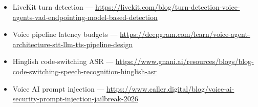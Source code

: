 \documentclass[11pt,a4paper]{article}
\begin{document}
\begin{itemize}[leftmargin=1.1em]
\item LiveKit turn detection --- \url{https://livekit.com/blog/turn-detection-voice-agents-vad-endpointing-model-based-detection}
\item Voice pipeline latency budgets --- \url{https://deepgram.com/learn/voice-agent-architecture-stt-llm-tts-pipeline-design}
\item Hinglish code-switching ASR --- \url{https://www.gnani.ai/resources/blogs/blog-code-switching-speech-recognition-hinglish-asr}
\item Voice AI prompt injection --- \url{https://www.caller.digital/blog/voice-ai-security-prompt-injection-jailbreak-2026}
\end{itemize}
\end{document}
